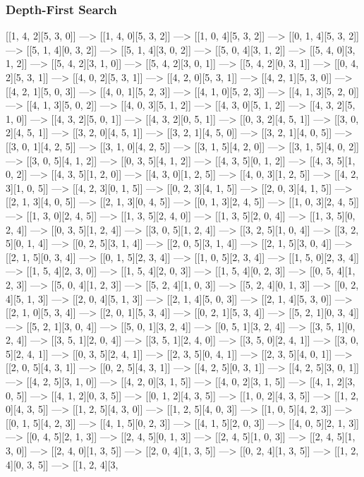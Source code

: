 \documentclass[paper=a4, fontsize=11pt]{scrartcl} %
\numberwithin{equation}{section} %
\numberwithin{figure}{section} %
\numberwithin{table}{section} %
\begin{document}
\subsubsection{Depth-First Search}
\begin{center}
[[1, 4, 2][5, 3, 0]] ---> [[1, 4, 0][5, 3, 2]] ---> [[1, 0, 4][5, 3, 2]] ---> [[0, 1, 4][5, 3, 2]] ---> [[5, 1, 4][0, 3, 2]] ---> [[5, 1, 4][3, 0, 2]] ---> [[5, 0, 4][3, 1, 2]] ---> [[5, 4, 0][3, 1, 2]] ---> [[5, 4, 2][3, 1, 0]] ---> [[5, 4, 2][3, 0, 1]] ---> [[5, 4, 2][0, 3, 1]] ---> [[0, 4, 2][5, 3, 1]] ---> [[4, 0, 2][5, 3, 1]] ---> [[4, 2, 0][5, 3, 1]] ---> [[4, 2, 1][5, 3, 0]] ---> [[4, 2, 1][5, 0, 3]] ---> [[4, 0, 1][5, 2, 3]] ---> [[4, 1, 0][5, 2, 3]] ---> [[4, 1, 3][5, 2, 0]] ---> [[4, 1, 3][5, 0, 2]] ---> [[4, 0, 3][5, 1, 2]] ---> [[4, 3, 0][5, 1, 2]] ---> [[4, 3, 2][5, 1, 0]] ---> [[4, 3, 2][5, 0, 1]] ---> [[4, 3, 2][0, 5, 1]] ---> [[0, 3, 2][4, 5, 1]] ---> [[3, 0, 2][4, 5, 1]] ---> [[3, 2, 0][4, 5, 1]] ---> [[3, 2, 1][4, 5, 0]] ---> [[3, 2, 1][4, 0, 5]] ---> [[3, 0, 1][4, 2, 5]] ---> [[3, 1, 0][4, 2, 5]] ---> [[3, 1, 5][4, 2, 0]] ---> [[3, 1, 5][4, 0, 2]] ---> [[3, 0, 5][4, 1, 2]] ---> [[0, 3, 5][4, 1, 2]] ---> [[4, 3, 5][0, 1, 2]] ---> [[4, 3, 5][1, 0, 2]] ---> [[4, 3, 5][1, 2, 0]] ---> [[4, 3, 0][1, 2, 5]] ---> [[4, 0, 3][1, 2, 5]] ---> [[4, 2, 3][1, 0, 5]] ---> [[4, 2, 3][0, 1, 5]] ---> [[0, 2, 3][4, 1, 5]] ---> [[2, 0, 3][4, 1, 5]] ---> [[2, 1, 3][4, 0, 5]] ---> [[2, 1, 3][0, 4, 5]] ---> [[0, 1, 3][2, 4, 5]] ---> [[1, 0, 3][2, 4, 5]] ---> [[1, 3, 0][2, 4, 5]] ---> [[1, 3, 5][2, 4, 0]] ---> [[1, 3, 5][2, 0, 4]] ---> [[1, 3, 5][0, 2, 4]] ---> [[0, 3, 5][1, 2, 4]] ---> [[3, 0, 5][1, 2, 4]] ---> [[3, 2, 5][1, 0, 4]] ---> [[3, 2, 5][0, 1, 4]] ---> [[0, 2, 5][3, 1, 4]] ---> [[2, 0, 5][3, 1, 4]] ---> [[2, 1, 5][3, 0, 4]] ---> [[2, 1, 5][0, 3, 4]] ---> [[0, 1, 5][2, 3, 4]] ---> [[1, 0, 5][2, 3, 4]] ---> [[1, 5, 0][2, 3, 4]] ---> [[1, 5, 4][2, 3, 0]] ---> [[1, 5, 4][2, 0, 3]] ---> [[1, 5, 4][0, 2, 3]] ---> [[0, 5, 4][1, 2, 3]] ---> [[5, 0, 4][1, 2, 3]] ---> [[5, 2, 4][1, 0, 3]] ---> [[5, 2, 4][0, 1, 3]] ---> [[0, 2, 4][5, 1, 3]] ---> [[2, 0, 4][5, 1, 3]] ---> [[2, 1, 4][5, 0, 3]] ---> [[2, 1, 4][5, 3, 0]] ---> [[2, 1, 0][5, 3, 4]] ---> [[2, 0, 1][5, 3, 4]] ---> [[0, 2, 1][5, 3, 4]] ---> [[5, 2, 1][0, 3, 4]] ---> [[5, 2, 1][3, 0, 4]] ---> [[5, 0, 1][3, 2, 4]] ---> [[0, 5, 1][3, 2, 4]] ---> [[3, 5, 1][0, 2, 4]] ---> [[3, 5, 1][2, 0, 4]] ---> [[3, 5, 1][2, 4, 0]] ---> [[3, 5, 0][2, 4, 1]] ---> [[3, 0, 5][2, 4, 1]] ---> [[0, 3, 5][2, 4, 1]] ---> [[2, 3, 5][0, 4, 1]] ---> [[2, 3, 5][4, 0, 1]] ---> [[2, 0, 5][4, 3, 1]] ---> [[0, 2, 5][4, 3, 1]] ---> [[4, 2, 5][0, 3, 1]] ---> [[4, 2, 5][3, 0, 1]] ---> [[4, 2, 5][3, 1, 0]] ---> [[4, 2, 0][3, 1, 5]] ---> [[4, 0, 2][3, 1, 5]] ---> [[4, 1, 2][3, 0, 5]] ---> [[4, 1, 2][0, 3, 5]] ---> [[0, 1, 2][4, 3, 5]] ---> [[1, 0, 2][4, 3, 5]] ---> [[1, 2, 0][4, 3, 5]] ---> [[1, 2, 5][4, 3, 0]] ---> [[1, 2, 5][4, 0, 3]] ---> [[1, 0, 5][4, 2, 3]] ---> [[0, 1, 5][4, 2, 3]] ---> [[4, 1, 5][0, 2, 3]] ---> [[4, 1, 5][2, 0, 3]] ---> [[4, 0, 5][2, 1, 3]] ---> [[0, 4, 5][2, 1, 3]] ---> [[2, 4, 5][0, 1, 3]] ---> [[2, 4, 5][1, 0, 3]] ---> [[2, 4, 5][1, 3, 0]] ---> [[2, 4, 0][1, 3, 5]] ---> [[2, 0, 4][1, 3, 5]] ---> [[0, 2, 4][1, 3, 5]] ---> [[1, 2, 4][0, 3, 5]] ---> [[1, 2, 4][3, 
\end{center}
\end{document}
